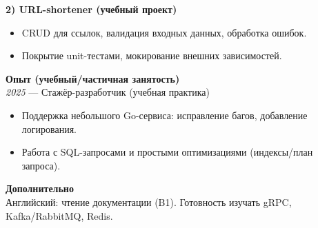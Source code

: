 \documentclass[11pt,a4paper]{article}
\begin{document}
\textbf{2) URL-shortener (учебный проект)}\\
\begin{itemize}
  \item CRUD для ссылок, валидация входных данных, обработка ошибок.
  \item Покрытие unit-тестами, мокирование внешних зависимостей.
\end{itemize}

\vspace{8pt}
\textbf{Опыт (учебный/частичная занятость)}\\
\textit{2025} — Стажёр-разработчик (учебная практика)\\
\begin{itemize}
  \item Поддержка небольшого Go-сервиса: исправление багов, добавление логирования.
  \item Работа с SQL-запросами и простыми оптимизациями (индексы/план запроса).
\end{itemize}

\vspace{8pt}
\textbf{Дополнительно}\\
Английский: чтение документации (B1). Готовность изучать gRPC, Kafka/RabbitMQ, Redis.
\end{document}
